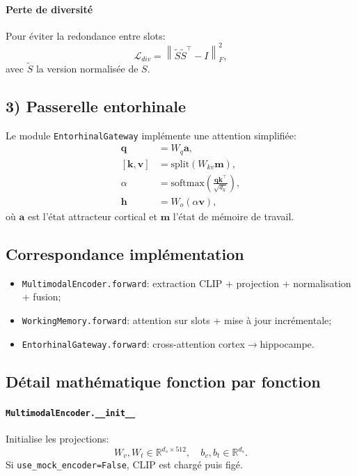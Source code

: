 \documentclass[12pt,a4paper]{article}
\begin{document}
\paragraph{Perte de diversité}
Pour éviter la redondance entre slots:
\begin{equation}
\mathcal{L}_{div}
= \left\| \tilde{S}\tilde{S}^\top - I \right\|_F^2,
\end{equation}
avec $\tilde{S}$ la version normalisée de $S$.

\subsection{3) Passerelle entorhinale}

Le module \texttt{EntorhinalGateway} implémente une attention simplifiée:
\begin{align}
\mathbf{q} &= W_q \mathbf{a},\\
[\mathbf{k},\mathbf{v}] &= \mathrm{split}(W_{kv}\mathbf{m}),\\
\alpha &= \mathrm{softmax}\!\left(\frac{\mathbf{q}\mathbf{k}^\top}{\sqrt{d_k}}\right),\\
\mathbf{h} &= W_o(\alpha \mathbf{v}),
\end{align}
où $\mathbf{a}$ est l'état attracteur cortical et $\mathbf{m}$ l'état de mémoire de travail.

\subsection{Correspondance implémentation}
\begin{itemize}
    \item \texttt{MultimodalEncoder.forward}: extraction CLIP + projection + normalisation + fusion;
    \item \texttt{WorkingMemory.forward}: attention sur slots + mise à jour incrémentale;
    \item \texttt{EntorhinalGateway.forward}: cross-attention cortex$\rightarrow$hippocampe.
\end{itemize}

\subsection{Détail mathématique fonction par fonction}

\paragraph{\texttt{MultimodalEncoder.\_\_init\_\_}}
Initialise les projections:
\[
W_v, W_t \in \mathbb{R}^{d_s \times 512}, \quad b_v,b_t\in\mathbb{R}^{d_s}.
\]
Si \texttt{use\_mock\_encoder=False}, CLIP est chargé puis figé.
\end{document}
